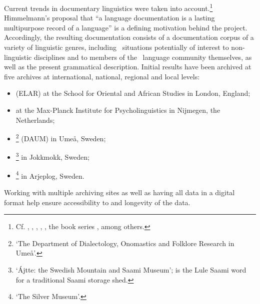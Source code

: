 Current trends in documentary linguistics were taken into account.\footnote{Cf. \citet{BirdSimons2003}, \citet{Gippert2006}, \citet{Woodbury2011}, \citet{AustinSallabank2011}, \citet{GrenobleFurbee2010}, the book series , among others.} 
Himmelmann’s proposal that “a language documentation is a lasting multipurpose record of a language” \citep[1]{Himmelmann2006a} is a defining motivation behind the project. Accordingly, the resulting documentation consists of a documentation corpus of a variety of linguistic genres, including \PS\ situations potentially of interest to non-linguistic disciplines and to members of the \PS\ language community themselves, as well as the present grammatical description. Initial results have been archived at five archives at international, national, regional and local levels:
\begin{itemize}
\item{ (ELAR) at the School for Oriental and African Studies in London, England;}
\item{ at the Max-Planck Institute for Psycholinguistics in Nijmegen, the Netherlands;}
\item{\footnote{‘The Department of Dialectology, Onomastics and Folklore Research in Umeå’.} (DAUM) in Umeå, Sweden;}
\item{\footnote{‘Ájtte: the Swedish Mountain and Saami Museum’;  is the Lule Saami word for a traditional Saami storage shed.} in Jokkmokk, Sweden;}
\item{\footnote{‘The Silver Museum’.} in Arjeplog, Sweden.}
\end{itemize}
Working with multiple archiving sites as well as having all data in a digital format help ensure accessibility to and longevity of the data. 

